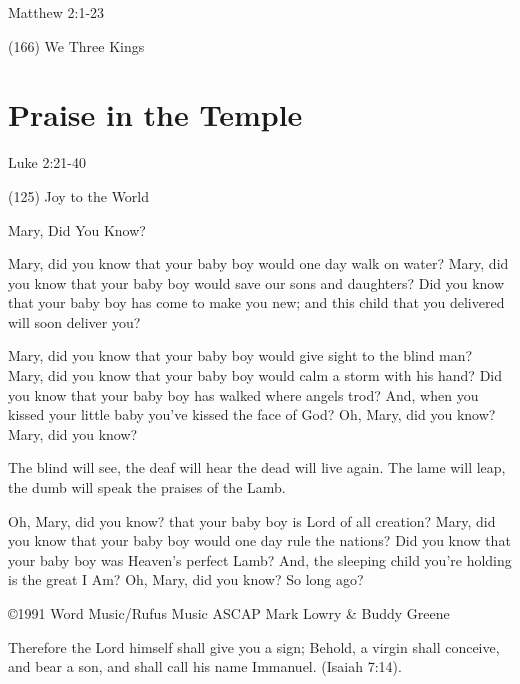 Matthew 2:1-23

(166) We Three Kings

\section{Praise in the Temple}

Luke 2:21-40

(125) Joy to the World


\pagebreak


Mary, Did You Know?

Mary, did you know that your baby boy
would one day walk on water?
Mary, did you know that your baby boy
would save our sons and daughters?
Did you know that your baby boy
has come to make you new;
and this child that you delivered
will soon deliver you?

Mary, did you know that your baby boy
would give sight to the blind man?
Mary, did you know that your baby boy
would calm a storm with his hand?
Did you know that your baby boy
has walked where angels trod?
And, when you kissed your little baby
you've kissed the face of God?
Oh, Mary, did you know?
Mary, did you know?

The blind will see, the deaf will hear
the dead will live again.
The lame will leap,
the dumb will speak the praises of the Lamb.

Oh, Mary, did you know?
that your baby boy is Lord of all creation?
Mary, did you know that your baby boy
would one day rule the nations?
Did you know that your baby boy
was Heaven's perfect Lamb?
And, the sleeping child you're holding is the great I Am?
Oh, Mary, did you know?
So long ago?


\copyright 1991 Word Music/Rufus Music ASCAP Mark Lowry \& Buddy Greene




Therefore the Lord himself shall give you a sign; Behold, a virgin shall
conceive, and bear a son, and shall call his name Immanuel. (Isaiah 7:14).

